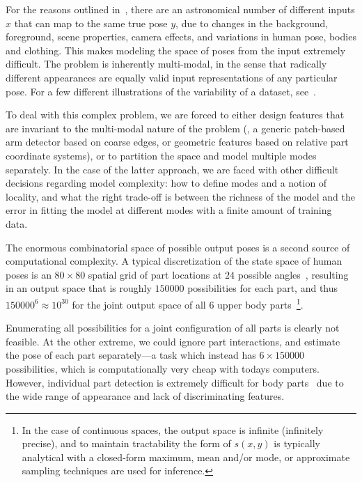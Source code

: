  For the reasons outlined 
in~, there are an astronomical number of different inputs 
$x$ that can map to the same true pose $y$, due to changes in the background, 
foreground, scene properties, camera effects, and variations in human pose, 
bodies and clothing.  This makes modeling the space of poses from the input 
extremely difficult.  The problem is inherently multi-modal, in the sense that 
radically different appearances are equally valid input representations of any 
particular pose.  For a few different illustrations of the variability of a 
dataset, see~. 

To deal with this complex problem, we are forced to either design features that 
are invariant to the multi-modal nature of the problem (\eg, a generic 
patch-based arm detector based on coarse edges, or geometric features based on 
relative part coordinate systems), or to partition the space and model multiple 
modes separately.  In the case of the latter approach, we are faced with other 
difficult decisions regarding model complexity: how to define modes and a 
notion of locality, and what the right trade-off is between the richness of the 
model and the error in fitting the model at different modes with a finite 
amount of training data.

The enormous combinatorial space of possible output poses is a second source of 
computational complexity.  A typical discretization of the state space of human 
poses is an $80 \times 80$ spatial grid of part locations at $24$ possible 
angles~\citep{felz05}, resulting in an output space that is roughly $150000$ 
possibilities for each part, and thus $150000^6 \approx 10^{30}$ for the joint 
output space of all $6$ upper body parts~\footnote{In the case of continuous 
spaces, the output space is infinite (infinitely precise), and to maintain 
tractability the form of $s(x,y)$ is typically analytical with a closed-form 
maximum, mean and/or mode, or approximate sampling techniques are used for 
inference.}.

Enumerating all possibilities for a joint configuration of all parts is clearly 
not feasible.  At the other extreme, we could ignore part interactions, and 
estimate the pose of each part separately---a task which instead has $6 \times 
150000$ possibilities, which is computationally very cheap with todays 
computers.  However, individual part detection is extremely difficult for body 
parts~\citep{andriluka09} due to the wide range of appearance and lack of 
discriminating features.

